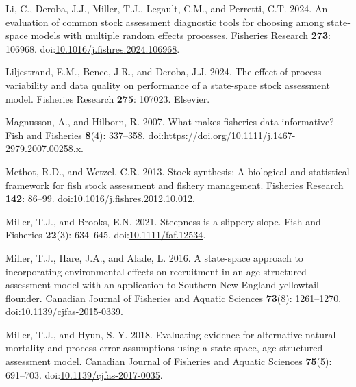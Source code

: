 \documentclass[
  12pt,
]{article}
\newlength{\cslhangindent}
\newlength{\cslentryspacingunit} %
\newenvironment{CSLReferences}[2] %
 {%
  \setlength{\parindent}{0pt}
  \ifodd #1
  \let\oldpar\par
  \def\par{\hangindent=\cslhangindent\oldpar}
  \fi
  \setlength{\parskip}{#2\cslentryspacingunit}
 }%
 {}
\begin{document}
\begin{CSLReferences}{1}{0}
\leavevmode{}%
Li, C., Deroba, J.J., Miller, T.J., Legault, C.M., and Perretti, C.T.
2024. An evaluation of common stock assessment diagnostic tools for
choosing among state-space models with multiple random effects
processes. Fisheries Research \textbf{273}: 106968.
doi:\href{https://doi.org/10.1016/j.fishres.2024.106968}{10.1016/j.fishres.2024.106968}.

\leavevmode{}%
Liljestrand, E.M., Bence, J.R., and Deroba, J.J. 2024. The effect of
process variability and data quality on performance of a state-space
stock assessment model. Fisheries Research \textbf{275}: 107023.
Elsevier.

\leavevmode{}%
Magnusson, A., and Hilborn, R. 2007. What makes fisheries data
informative? Fish and Fisheries \textbf{8}(4): 337--358.
doi:\url{https://doi.org/10.1111/j.1467-2979.2007.00258.x}.

\leavevmode{}%
Methot, R.D., and Wetzel, C.R. 2013. Stock synthesis: A biological and
statistical framework for fish stock assessment and fishery management.
Fisheries Research \textbf{142}: 86--99.
doi:\href{https://doi.org/10.1016/j.fishres.2012.10.012}{10.1016/j.fishres.2012.10.012}.

\leavevmode{}%
Miller, T.J., and Brooks, E.N. 2021. Steepness is a slippery slope. Fish
and Fisheries \textbf{22}(3): 634--645.
doi:\href{https://doi.org/10.1111/faf.12534}{10.1111/faf.12534}.

\leavevmode{}%
Miller, T.J., Hare, J.A., and Alade, L. 2016. A state-space approach to
incorporating environmental effects on recruitment in an age-structured
assessment model with an application to {S}outhern {N}ew {E}ngland
yellowtail flounder. Canadian Journal of Fisheries and Aquatic Sciences
\textbf{73}(8): 1261--1270.
doi:\href{https://doi.org/10.1139/cjfas-2015-0339}{10.1139/cjfas-2015-0339}.

\leavevmode{}%
Miller, T.J., and Hyun, S.-Y. 2018. Evaluating evidence for alternative
natural mortality and process error assumptions using a state-space,
age-structured assessment model. Canadian Journal of Fisheries and
Aquatic Sciences \textbf{75}(5): 691--703.
doi:\href{https://doi.org/10.1139/cjfas-2017-0035}{10.1139/cjfas-2017-0035}.


\end{CSLReferences}
\end{document}

